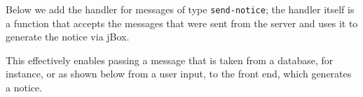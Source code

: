 \documentclass[10pt,]{krantz}
\makeatletter
\newenvironment{Shaded}{\begin{snugshade}}{\end{snugshade}}
\newcommand{\KeywordTok}[1]{\textcolor[rgb]{0.27,0.27,0.27}{\textbf{#1}}}
\newcommand{\NormalTok}[1]{#1}
\newcommand{\OperatorTok}[1]{\textcolor[rgb]{0.43,0.43,0.43}{\textbf{#1}}}
\newcommand{\StringTok}[1]{\textcolor[rgb]{0.5,0.5,0.5}{#1}}
\newenvironment{kframe}{%
\medskip{}
\setlength{\fboxsep}{.8em}
 \def\at@end@of@kframe{}%
 \ifinner\ifhmode%
  \def\at@end@of@kframe{\end{minipage}}%
  \begin{minipage}{\columnwidth}%
 \fi\fi%
 \def\FrameCommand##1{\hskip\@totalleftmargin \hskip-\fboxsep
 \colorbox{shadecolor}{##1}\hskip-\fboxsep
     \hskip-\linewidth \hskip-\@totalleftmargin \hskip\columnwidth}%
 \MakeFramed {\advance\hsize-\width
   \@totalleftmargin\z@ \linewidth\hsize
   \@setminipage}}%
 {\par\unskip\endMakeFramed%
 \at@end@of@kframe}
\renewenvironment{Shaded}{\begin{kframe}}{\end{kframe}}
\makeatother
\begin{document}
Below we add the handler for messages of type \texttt{send-notice}; the handler itself is a function that accepts the messages that were sent from the server and uses it to generate the notice via jBox.

\begin{Shaded}
\end{Shaded}

This effectively enables passing a message that is taken from a database, for instance, or as shown below from a user input, to the front end, which generates a notice.
\end{document}

